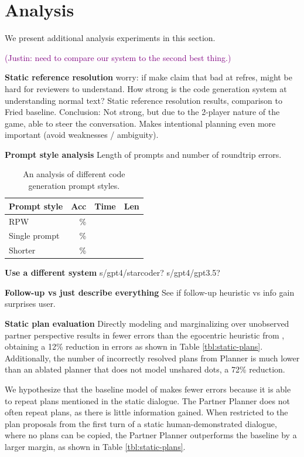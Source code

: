 \documentclass[11pt]{article}
\newcommand{\system}{RPW}
\newcommand{\justin}[1]{{{\textcolor{purple}{(Justin: #1)}}}}
\begin{document}
\section{Analysis}
We present additional analysis experiments in this section.

\justin{need to compare our system to the 
second best thing.}

\textbf{Static reference resolution}
worry: if make claim that bad at refres, might be hard for reviewers to understand. How strong is the code generation system at understanding normal text?
Static reference resolution results, comparison to Fried baseline.
Conclusion: Not strong, but due to the 2-player nature of the game,
able to steer the conversation.
Makes intentional planning even more important (avoid weaknesses / ambiguity).


\textbf{Prompt style analysis}
Length of prompts and number of roundtrip errors.

\begin{table}[!t]
\centering
\begin{tabular}{lrrr}
\toprule
Prompt style                   & Acc & Time & Len\\
\midrule
\system{}                      & \%  &    &  \\
Single prompt                  & \%  &    & \\
Shorter                        & \%  &    &  \\
\bottomrule
\end{tabular}
\caption{\label{tbl:prompt}
An analysis of different code generation prompt styles.
}
\end{table}

\textbf{Use a different system}
s/gpt4/starcoder?
s/gpt4/gpt3.5?

\textbf{Follow-up vs just describe everything}
See if follow-up heuristic vs info gain surprises user.

\textbf{Static plan evaluation}
Directly modeling and marginalizing over unobserved partner perspective results in fewer
errors than the egocentric heuristic from \citet{fried}, obtaining a 12\% reduction in errors as shown in Table \ref{tbl:static-plans}.
Additionally, the number of incorrectly resolved plans from Planner is much lower than an ablated planner that does not model unshared dots, a 72\% reduction.

We hypothesize that the baseline model of \citet{fried} makes fewer errors because it is able to repeat plans mentioned in the static dialogue.
The Partner Planner does not often repeat plans, as there is little information gained.
When restricted to the plan proposals from the first turn of a static human-demonstrated dialogue, where no plans can be copied, the Partner Planner outperforms the baseline by a larger margin, as shown in Table \ref{tbl:static-plans}.
\end{document}
